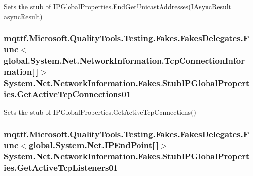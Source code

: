 Sets the stub of I\-P\-Global\-Properties.\-End\-Get\-Unicast\-Addresses(\-I\-Async\-Result async\-Result)

\hypertarget{class_system_1_1_net_1_1_network_information_1_1_fakes_1_1_stub_i_p_global_properties_a3ee9f4deb6705ae6f4d47b9667309714}{
\subsubsection[{Get\-Active\-Tcp\-Connections01}]{\setlength{\rightskip}{0pt plus 5cm}mqttf.\-Microsoft.\-Quality\-Tools.\-Testing.\-Fakes.\-Fakes\-Delegates.\-Func$<$global.\-System.\-Net.\-Network\-Information.\-Tcp\-Connection\-Information\mbox{[}$\,$\mbox{]}$>$ System.\-Net.\-Network\-Information.\-Fakes.\-Stub\-I\-P\-Global\-Properties.\-Get\-Active\-Tcp\-Connections01}}\label{class_system_1_1_net_1_1_network_information_1_1_fakes_1_1_stub_i_p_global_properties_a3ee9f4deb6705ae6f4d47b9667309714}


Sets the stub of I\-P\-Global\-Properties.\-Get\-Active\-Tcp\-Connections()

\hypertarget{class_system_1_1_net_1_1_network_information_1_1_fakes_1_1_stub_i_p_global_properties_a4c55787049a7c203a8c4e41a5fc292a0}{
\subsubsection[{Get\-Active\-Tcp\-Listeners01}]{\setlength{\rightskip}{0pt plus 5cm}mqttf.\-Microsoft.\-Quality\-Tools.\-Testing.\-Fakes.\-Fakes\-Delegates.\-Func$<$global.\-System.\-Net.\-I\-P\-End\-Point\mbox{[}$\,$\mbox{]}$>$ System.\-Net.\-Network\-Information.\-Fakes.\-Stub\-I\-P\-Global\-Properties.\-Get\-Active\-Tcp\-Listeners01}}\label{class_system_1_1_net_1_1_network_information_1_1_fakes_1_1_stub_i_p_global_properties_a4c55787049a7c203a8c4e41a5fc292a0}


